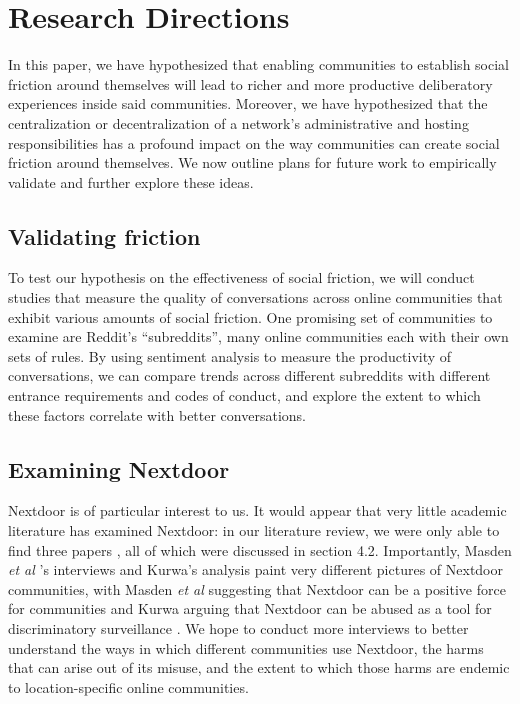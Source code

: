 \documentclass[sigconf,authordraft]{acmart}
\newcommand{\etal}{{\itshape et al }}
\begin{document}



\section{Research Directions}

In this paper, we have hypothesized that enabling communities to establish social friction around themselves will lead to richer and more productive deliberatory experiences inside said communities. Moreover, we have hypothesized that the centralization or decentralization of a network's administrative and hosting responsibilities has a profound impact on the way communities can create social friction around themselves. We now outline plans for future work to empirically validate and further explore these ideas.

\subsection{Validating friction}

To test our hypothesis on the effectiveness of social friction, we will conduct studies that measure the quality of conversations across online communities that exhibit various amounts of social friction. One promising set of communities to examine are Reddit's ``subreddits'', many online communities each with their own sets of rules. By using sentiment analysis to measure the productivity of conversations, we can compare trends across different subreddits with different entrance requirements and codes of conduct, and explore the extent to which these factors correlate with better conversations.

\subsection{Examining Nextdoor}

Nextdoor is of particular interest to us. It would appear that very little academic literature has examined Nextdoor: in our literature review, we were only able to find three papers \cite{masden2014tensions, kurwa2019building, payne2017welcome}, all of which were discussed in section 4.2. Importantly, Masden \etal's interviews and Kurwa's analysis paint very different pictures of Nextdoor communities, with Masden \etal suggesting that Nextdoor can be a positive force for communities \cite{masden2014tensions} and Kurwa arguing that Nextdoor can be abused as a tool for discriminatory surveillance \cite{kurwa2019building}. We hope to conduct more interviews to better understand the ways in which different communities use Nextdoor, the harms that can arise out of its misuse, and the extent to which those harms are endemic to location-specific online communities.
\end{document}
